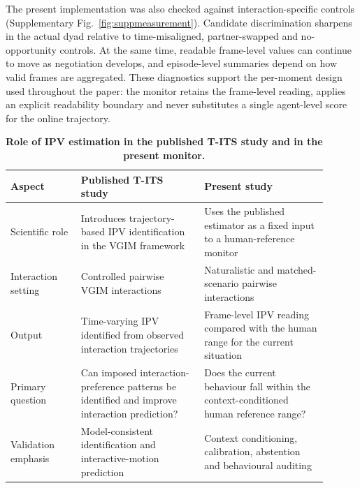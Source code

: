 \documentclass[12pt,a4paper]{article}
\begin{document}
The present implementation was also checked against interaction-specific controls
(Supplementary Fig.~\ref{fig:suppmeasurement}). Candidate discrimination sharpens in the actual dyad
relative to time-misaligned, partner-swapped and no-opportunity controls. At the same time, readable
frame-level values can continue to move as negotiation develops, and episode-level summaries depend
on how valid frames are aggregated. These diagnostics support the per-moment design used throughout
the paper: the monitor retains the frame-level reading, applies an explicit readability boundary and
never substitutes a single agent-level score for the online trajectory.

\begin{table}[!htb]
\centering
\small
\caption{\textbf{Role of IPV estimation in the published T-ITS study and in the present monitor.}}
\label{tab:suppipv}
\begin{tabular}{p{0.20\linewidth}p{0.35\linewidth}p{0.35\linewidth}}
\toprule
Aspect & Published T-ITS study~\cite{zhao2024measuring} & Present study \\
\midrule
Scientific role & Introduces trajectory-based IPV identification in the VGIM framework & Uses the published estimator as a fixed input to a human-reference monitor \\
Interaction setting & Controlled pairwise VGIM interactions & Naturalistic and matched-scenario pairwise interactions \\
Output & Time-varying IPV identified from observed interaction trajectories & Frame-level IPV reading compared with the human range for the current situation \\
Primary question & Can imposed interaction-preference patterns be identified and improve interaction prediction? & Does the current behaviour fall within the context-conditioned human reference range? \\
Validation emphasis & Model-consistent identification and interactive-motion prediction & Context conditioning, calibration, abstention and behavioural auditing \\
\bottomrule
\end{tabular}
\end{table}
\end{document}
